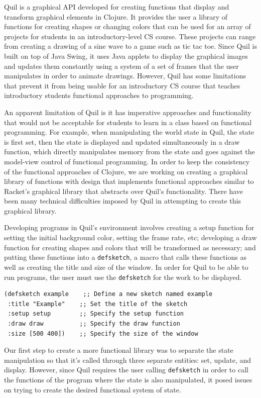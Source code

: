 \documentclass[12pt]{article}
\begin{document}
Quil is a graphical API developed for creating functions that display and transform graphical elements in Clojure. It provides the user a library of functions for creating shapes or changing colors that can be used for an array of projects for students in an introductory-level CS course. These projects can range from creating a drawing of a sine wave to a game such as tic tac toe. Since Quil is built on top of Java Swing, it uses Java applets to display the graphical images and updates them constantly using a system of a set of frames that the user manipulates in order to animate drawings. However, Quil has some limitations that prevent it from being usable for an introductory CS course that teaches introductory students functional approaches to programming.

An apparent limitation of Quil is it has imperative approaches and functionality that would not be acceptable for students to learn in a class based on functional programming. For example, when manipulating the world state in Quil, the state is first set, then the state is displayed and updated simultaneously in a draw function, which directly manipulates memory from the state and goes against the model-view control of functional programming. In order to keep the consistency of the functional approaches of Clojure, we are working on creating a graphical library of functions with design that implements functional approaches similar to Racket’s graphical library that abstracts over Quil's functionality. There have been many technical difficulties imposed by Quil in attempting to create this graphical library.

Developing programs in Quil's environment involves creating a setup function for setting the initial background color, setting the frame rate, etc; developing a draw function for creating shapes and colors that will be transformed as necessary; and putting these functions into a \texttt{defsketch}, a macro that calls these functions as well as creating the title and size of the window. In order for Quil to be able to run programs, the user must use the \texttt{defsketch} for the work to be displayed.
\begin{verbatim}
(defsketch example    ;; Define a new sketch named example
 :title "Example"    ;; Set the title of the sketch
 :setup setup        ;; Specify the setup function
 :draw draw          ;; Specify the draw function
 :size [500 400])    ;; Specify the size of the window
\end{verbatim}
Our first step to create a more functional library was to separate the state manipulation so that it’s called through three separate entities: set, update, and display. However, since Quil requires the user calling \texttt{defsketch} in order to call the functions of the program where the state is also manipulated, it posed issues on trying to create the desired functional system of state. 
\end{document}

